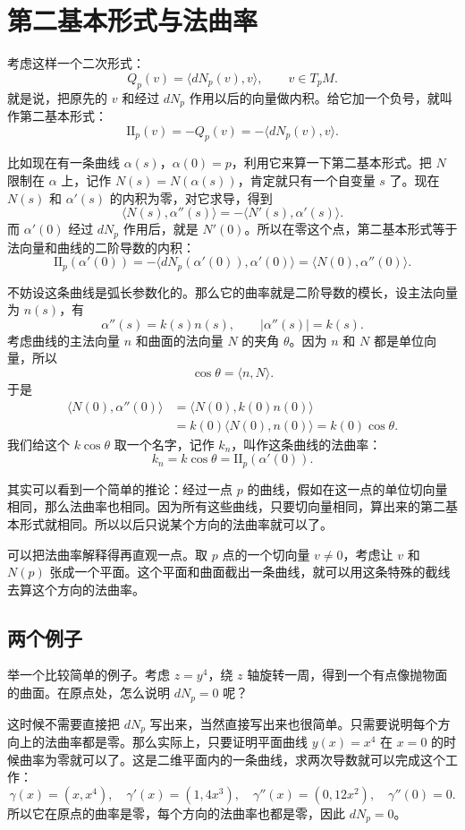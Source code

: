 \documentclass[UTF8,11pt,a4paper]{ctexart}
\newcommand{\ip}[2]{\langle #1,#2\rangle}
\newcommand{\II}{\mathrm{II}}
\begin{document}
\section{第二基本形式与法曲率}

考虑这样一个二次形式：
\[
Q_p(v)=\ip{dN_p(v)}{v},\qquad v\in T_pM.
\]
就是说，把原先的 $v$ 和经过 $dN_p$ 作用以后的向量做内积。给它加一个负号，就叫作第二基本形式：
\[
\II_p(v)=-Q_p(v)=-\ip{dN_p(v)}{v}.
\]

比如现在有一条曲线 $\alpha(s)$，$\alpha(0)=p$，利用它来算一下第二基本形式。把 $N$ 限制在 $\alpha$ 上，记作 $N(s)=N(\alpha(s))$，肯定就只有一个自变量 $s$ 了。现在 $N(s)$ 和 $\alpha'(s)$ 的内积为零，对它求导，得到
\[
\ip{N(s)}{\alpha''(s)}=-\ip{N'(s)}{\alpha'(s)}.
\]
而 $\alpha'(0)$ 经过 $dN_p$ 作用后，就是 $N'(0)$。所以在零这个点，第二基本形式等于法向量和曲线的二阶导数的内积：
\[
\II_p(\alpha'(0))
=-\ip{dN_p(\alpha'(0))}{\alpha'(0)}
=\ip{N(0)}{\alpha''(0)}.
\]

不妨设这条曲线是弧长参数化的。那么它的曲率就是二阶导数的模长，设主法向量为 $n(s)$，有
\[
\alpha''(s)=k(s)n(s),\qquad |\alpha''(s)|=k(s).
\]
考虑曲线的主法向量 $n$ 和曲面的法向量 $N$ 的夹角 $\theta$。因为 $n$ 和 $N$ 都是单位向量，所以
\[
\cos\theta=\ip{n}{N}.
\]
于是
\[
\begin{aligned}
\ip{N(0)}{\alpha''(0)}
&=\ip{N(0)}{k(0)n(0)}\\
&=k(0)\ip{N(0)}{n(0)}
=k(0)\cos\theta.
\end{aligned}
\]
我们给这个 $k\cos\theta$ 取一个名字，记作 $k_n$，叫作这条曲线的法曲率：
\[
k_n=k\cos\theta=\II_p(\alpha'(0)).
\]

其实可以看到一个简单的推论：经过一点 $p$ 的曲线，假如在这一点的单位切向量相同，那么法曲率也相同。因为所有这些曲线，只要切向量相同，算出来的第二基本形式就相同。所以以后只说某个方向的法曲率就可以了。

可以把法曲率解释得再直观一点。取 $p$ 点的一个切向量 $v\ne0$，考虑让 $v$ 和 $N(p)$ 张成一个平面。这个平面和曲面截出一条曲线，就可以用这条特殊的截线去算这个方向的法曲率。

\subsection{两个例子}

举一个比较简单的例子。考虑 $z=y^4$，绕 $z$ 轴旋转一周，得到一个有点像抛物面的曲面。在原点处，怎么说明 $dN_p=0$ 呢？

这时候不需要直接把 $dN_p$ 写出来，当然直接写出来也很简单。只需要说明每个方向上的法曲率都是零。那么实际上，只要证明平面曲线 $y(x)=x^4$ 在 $x=0$ 的时候曲率为零就可以了。这是二维平面内的一条曲线，求两次导数就可以完成这个工作：
\[
\gamma(x)=(x,x^4),\quad
\gamma'(x)=(1,4x^3),\quad
\gamma''(x)=(0,12x^2),\quad
\gamma''(0)=0.
\]
所以它在原点的曲率是零，每个方向的法曲率也都是零，因此 $dN_p=0$。
\end{document}
